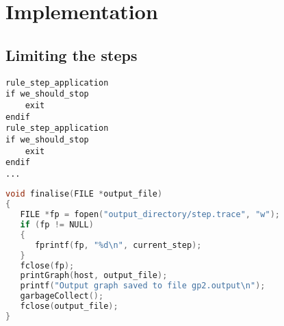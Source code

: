 \documentclass{UoYCSproject}
\begin{document}
	
 
\chapter{Implementation}

\section{Limiting the steps} %




\begin{lstlisting}[label=code:breakpoint_1, caption=Pseudocode of breakpoints]
rule_step_application
if we_should_stop
    exit
endif
rule_step_application
if we_should_stop
    exit
endif
...
\end{lstlisting}


\begin{lstlisting}[label=code:save_current_step, caption=Finalise step, language=C]
void finalise(FILE *output_file)
{
   FILE *fp = fopen("output_directory/step.trace", "w");
   if (fp != NULL)
   {
      fprintf(fp, "%d\n", current_step);
   }
   fclose(fp);
   printGraph(host, output_file);
   printf("Output graph saved to file gp2.output\n");
   garbageCollect();
   fclose(output_file);
}
\end{lstlisting}
\end{document}
